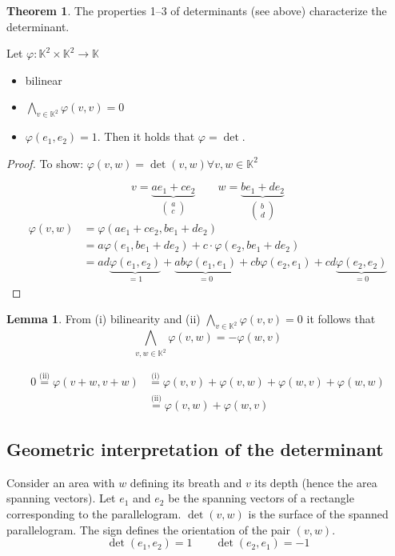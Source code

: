 \documentclass[a4paper,landscape,twocolumn]{article}
\theoremstyle{definition}
\newtheorem{theorem}{Theorem}
\newtheorem{lemma}{Lemma}
\begin{document}
\begin{theorem}
  \label{satz-7.3}
  The properties 1--3 of determinants (see above) characterize the determinant.

  Let $\varphi: \mathbb K^2 \times \mathbb K^2 \to \mathbb K$
  \begin{itemize}
    \item bilinear
    \item $\bigwedge_{v \in \mathbb K^2} \varphi(v,v) = 0$
    \item $\varphi(e_1, e_2) = 1$.
      Then it holds that $\varphi = \det$.
  \end{itemize}
\end{theorem}
\begin{proof}
  To show: $\varphi(v,w) = \det(v,w) \forall v,w \in \mathbb K^2$

  \[
    v = \underbrace{a e_1 + c e_2}_{\begin{pmatrix} a \\ c \end{pmatrix}}
    \qquad
    w = \underbrace{b e_1 + d e_2}_{\begin{pmatrix} b \\ d \end{pmatrix}}
  \] \begin{align*}
    \varphi(v,w) &= \varphi(a e_1 + c e_2, b e_1 + d e_2) \\
      &= a\varphi(e_1, be_1 + de_2) + c \cdot \varphi(e_2, be_1 + de_2) \\
      &= ad \underbrace{\varphi(e_1, e_2)}_{=1} + \underbrace{ab \varphi(e_1, e_1)}_{=0} + cb \varphi(e_2, e_1) + cd \underbrace{\varphi(e_2, e_2)}_{=0}
  \end{align*}
\end{proof}

\begin{lemma}
  \label{lemma-7.4}
  From (i) bilinearity and (ii) $\bigwedge_{v \in \mathbb K^2} \varphi(v,v) = 0$ it follows that
  \[ \bigwedge_{v,w \in \mathbb K^2} \varphi(v,w) = - \varphi(w, v) \]

  \begin{align*}
    0 \overset{\text{(ii)}}{=} \varphi(v+w, v+w)
      &\overset{\text{(i)}}{=} \varphi(v,v) + \varphi(v,w) + \varphi(w,v) + \varphi(w,w) \\
      &\overset{\text{(ii)}}{=} \varphi(v,w) + \varphi(w,v)
  \end{align*}
\end{lemma}

\subsection{Geometric interpretation of the determinant}
%
Consider an area with $w$ defining its breath and $v$ its depth (hence the area spanning vectors).
Let $e_1$ and $e_2$ be the spanning vectors of a rectangle corresponding to the parallelogram.
$\det(v,w)$ is the surface of the spanned parallelogram.
The sign defines the orientation of the pair $(v, w)$.
\[ \det(e_1, e_2) = 1 \qquad \det(e_2, e_1) = -1 \]
\end{document}
